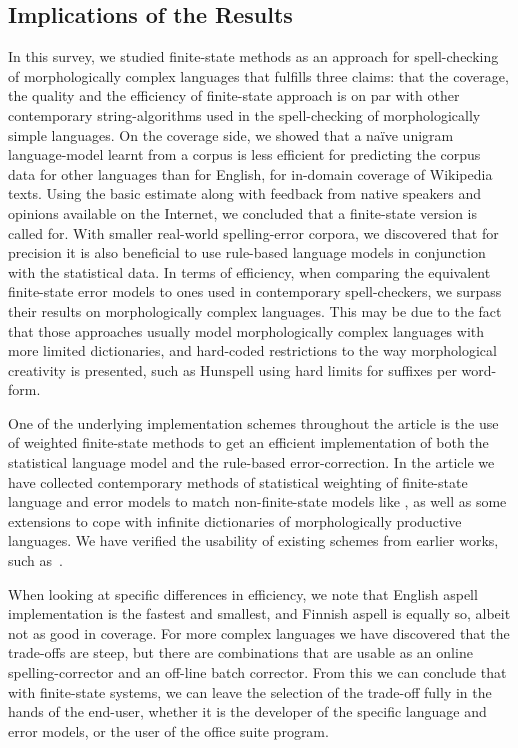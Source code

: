 \documentclass[a4paper,12pt]{article}
\begin{document}
\subsection{Implications of the Results}

In this survey, we studied finite-state methods as an approach for
spell-checking of morphologically complex languages that fulfills three claims:
that the coverage, the quality and the efficiency of finite-state approach is 
on par with other contemporary string-algorithms used in the spell-checking
of morphologically simple languages. On the coverage side, we showed
that a naïve unigram language-model learnt from a corpus is less efficient for
predicting the corpus data for other languages than for English, for in-domain
coverage of Wikipedia texts. Using the basic estimate along with feedback
from native speakers and opinions available on the Internet,
we concluded that a finite-state version is called for. With smaller real-world
spelling-error corpora, we discovered that for precision it is also beneficial
to use rule-based language models in conjunction with the statistical data.
In terms of efficiency, when comparing the equivalent finite-state error models to 
ones used in contemporary spell-checkers, we surpass their results on
morphologically complex languages. This may be due to the fact that those
approaches usually model morphologically complex languages with more limited
dictionaries, and hard-coded restrictions to the way morphological creativity is
presented, such as Hunspell using hard limits for suffixes per word-form.

One of the underlying implementation schemes throughout the article is the use
of weighted finite-state methods to get an efficient implementation of both the
statistical language model and the rule-based error-correction. In the article
we have collected contemporary methods of statistical weighting of
finite-state language and error models to match non-finite-state models
like \cite{church1991probability}, as well as some extensions to cope with infinite
dictionaries of morphologically productive languages. We have verified the
usability of existing schemes from earlier works, such
as~\cite{pirinen/2009/nodalida,pirinen/2010/lrec}.

When looking at specific differences in efficiency, we note that English aspell
implementation is the fastest and smallest, and Finnish aspell is equally so,
albeit not as good in coverage. For more complex
languages we have discovered that the trade-offs are steep, but there are
combinations that are usable as an online spelling-corrector and an off-line batch
corrector. From this we can conclude that with finite-state systems, we can
leave the selection of the trade-off fully in the hands of the end-user,
whether it is the developer of the specific language and error models, or the
user of the office suite program.
\end{document}
